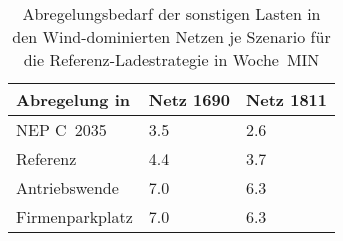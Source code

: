 {
\renewcommand{\arraystretch}{1.2}%
\begin{table}[H]
	\begin{center}
		\caption{Abregelungsbedarf der sonstigen Lasten in den Wind-dominierten Netzen je Szenario für die Referenz-Ladestrategie in Woche~MIN}
		\begin{tabu} to 0.6\textwidth {X[1.5] X[1, r] X[1, r]}
			\toprule
			Abregelung in   \si{\mwh}    & Netz \num{1690} & Netz \num{1811} \\ \midrule
			NEP C~\num{2035}             & \num{3.5}       & \num{2.6}       \\
			Referenz                     & \num{4.4}       & \num{3.7}       \\
			Antriebswende                & \num{7.0}       & \num{6.3}       \\
			\glqq Firmenparkplatz\grqq{} & \num{7.0}       & \num{6.3}       \\ \bottomrule
		\end{tabu}
		\label{tab:wind_dominated_week_a_load_cur}
	\end{center}
	\vspace{-3mm}%
\end{table}
}